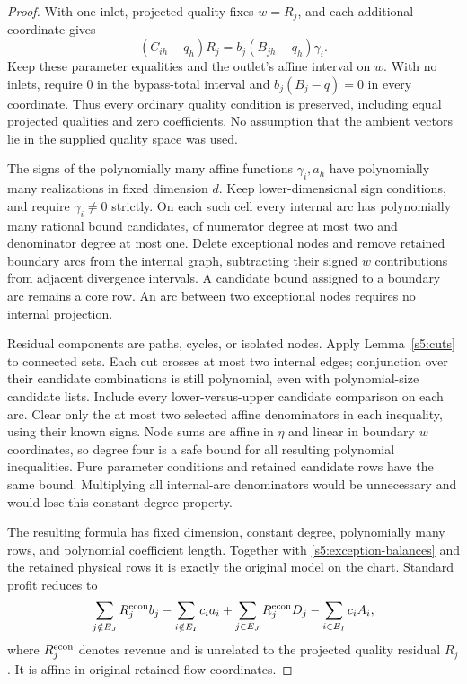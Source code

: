 \begin{proof}
With one inlet, projected quality fixes $w=R_j$, and each additional
coordinate gives
\[
 (C_{ih}-q_h)R_j=b_j(B_{jh}-q_h)\gamma_i.
\]
Keep these parameter equalities and the outlet's affine interval on
$w$. With no inlets, require $0$ in the bypass-total interval and
$b_j(B_j-q)=0$ in every coordinate. Thus every ordinary quality
condition is preserved, including equal projected qualities and zero
coefficients. No assumption that the ambient vectors lie in the supplied
quality space was used.

The signs of the polynomially many affine functions $\gamma_i,a_h$
have polynomially many realizations in fixed dimension $d$. Keep
lower-dimensional sign conditions, and require $\gamma_i\ne0$ strictly.
On each such cell every internal arc has polynomially many rational
bound candidates, of numerator degree at most two and denominator
degree at most one. Delete exceptional nodes and remove retained
boundary arcs from the internal graph, subtracting their signed $w$
contributions from adjacent divergence intervals. A candidate bound
assigned to a boundary arc remains a core row. An arc between two
exceptional nodes requires no internal projection.

Residual components are paths, cycles, or isolated nodes. Apply
Lemma~\ref{s5:cuts} to connected sets. Each cut crosses at most two
internal edges; conjunction over their candidate combinations is still
polynomial, even with polynomial-size candidate lists. Include every
lower-versus-upper candidate comparison on each arc. Clear only the
at most two selected affine denominators in each inequality, using their
known signs. Node sums are affine in $\eta$ and linear in boundary
$w$ coordinates, so degree four is a safe bound for all resulting
polynomial inequalities. Pure parameter conditions and retained
candidate rows have the same bound. Multiplying all internal-arc
denominators would be unnecessary and would lose this constant-degree
property.

The resulting formula has fixed dimension, constant degree,
polynomially many rows, and polynomial coefficient length. Together
with \eqref{s5:exception-balances} and the retained physical rows it is
exactly the original model on the chart. Standard profit reduces to
\begin{equation}
 \sum_{j\notin E_J}R_j^{\rm econ}b_j-
 \sum_{i\notin E_I}c_i a_i+
 \sum_{j\in E_J}R_j^{\rm econ}D_j-
 \sum_{i\in E_I}c_i A_i,
 \label{s5:exception-profit}
\end{equation}
where $R_j^{\rm econ}$ denotes revenue and is unrelated to the
projected quality residual $R_j$. It is affine in original retained
flow coordinates.


\end{proof}
